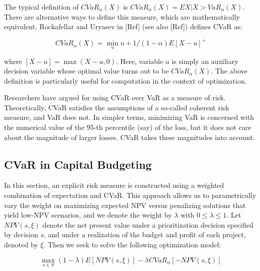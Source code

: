 The typical definition of $CVaR_\alpha (X)$ is $CVaR_\alpha (X) = E{X|X > VaR_\alpha (X)}$.
There are alternative ways to define this measure, which are mathematically equivalent.
Rockafellar and Uryasev in [Ref] (see also [Ref]) defines CVaR as:

\begin{equation}
CVaR_\alpha (X) = \min_u {u + 1/(1-\alpha) E[X-u]^+}
\end{equation}

where $[X-u] = \max (X - u, 0)$. Here, variable $u$ is simply an auxiliary decision
variable whose optimal value turns out to be $CVaR_\alpha (X)$. The above definition
is particularly useful for computation in the context of optimization.

Researchers have argued for using CVaR over VaR as a measure of risk. Theoretically,
CVaR satisfies the assumptions of a so-called coherent risk measure, and VaR does not.
In simpler terms, minimizing VaR is concerned with the numerical value of the 95-th
percentile (say) of the loss, but it does not care about the magnitude of larger losses.
CVaR takes these magnitudes into account.

\subsection{CVaR in Capital Budgeting}
\label{CVaRCapitalBudgeting}
In this section, an explicit risk measure is constructed using a weighted
combination of expectation and CVaR. This approach allows us to parametrically
vary the weight on maximizing expected NPV versus penalizing solutions that yield
low-NPV scenarios, and we denote the weight by $\lambda$ with $0 \le \lambda \le 1$.
Let $NPV(s,\xi)$ denote the net present value under a prioritization decision
specified by decision $s$, and under a realization of the budget and profit of
each project, denoted by $\xi$. Then we seek to solve the following optimization
model:

\begin{equation}
\max_{s\in S} (1-\lambda)E[NPV(s, \xi)] - \lambda CVaR_\alpha [-NPV(s, \xi)]
\end{equation}

